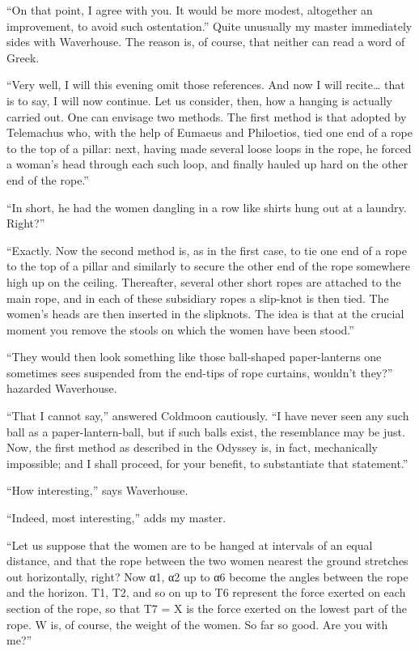 \documentclass{book}
\begin{document}
``On that point, I agree with you. It would be more modest, altogether
an improvement, to avoid such ostentation.'' Quite unusually my master
immediately sides with Waverhouse. The reason is, of course, that
neither can read a word of Greek.

``Very well, I will this evening omit those references. And now I will
recite\ldots{} that is to say, I will now continue. Let us consider,
then, how a hanging is actually carried out. One can envisage two
methods. The first method is that adopted by Telemachus who, with the
help of Eumaeus and Philoetios, tied one end of a rope to the top of a
pillar: next, having made several loose loops in the rope, he forced a
woman's head through each such loop, and finally hauled up hard on the
other end of the rope.''

``In short, he had the women dangling in a row like shirts hung out at a
laundry. Right?''

``Exactly. Now the second method is, as in the first case, to tie one
end of a rope to the top of a pillar and similarly to secure the other
end of the rope somewhere high up on the ceiling. Thereafter, several
other short ropes are attached to the main rope, and in each of these
subsidiary ropes a slip-knot is then tied. The women's heads are then
inserted in the slipknots. The idea is that at the crucial moment you
remove the stools on which the women have been stood.''

``They would then look something like those ball-shaped paper-lanterns
one sometimes sees suspended from the end-tips of rope curtains,
wouldn't they?'' hazarded Waverhouse.

``That I cannot say,'' answered Coldmoon cautiously. ``I have never seen
any such ball as a paper-lantern-ball, but if such balls exist, the
resemblance may be just. Now, the first method as described in the
Odyssey is, in fact, mechanically impossible; and I shall proceed, for
your benefit, to substantiate that statement.''

``How interesting,'' says Waverhouse.

``Indeed, most interesting,'' adds my master.

``Let us suppose that the women are to be hanged at intervals of an
equal distance, and that the rope between the two women nearest the
ground stretches out horizontally, right? Now α1, α2 up to α6 become the
angles between the rope and the horizon. T1, T2, and so on up to T6
represent the force exerted on each section of the rope, so that T7 = X
is the force exerted on the lowest part of the rope. W is, of course,
the weight of the women. So far so good. Are you with me?''
\end{document}
